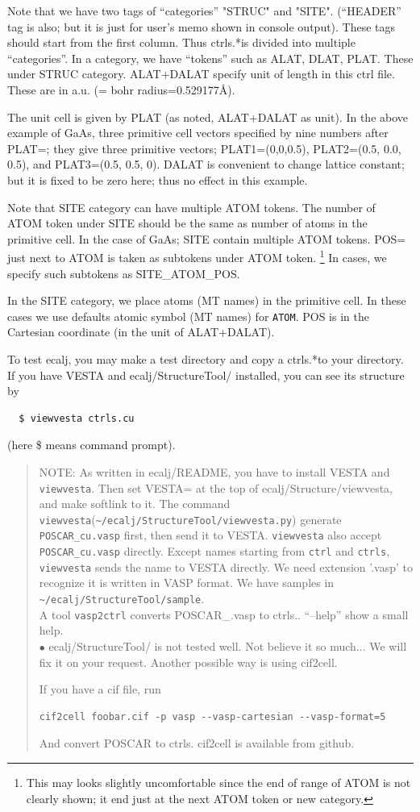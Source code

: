 \documentclass[a4paper,10pt,epsf,fleqn]{article}
\newcommand{\io}[1]{{\sf  #1}}
\newcommand{\ctrls}{{\io{ctrls.*}\space }}
\begin{document}
Note that we have two tags of ``categories'' "STRUC" and "SITE". 
(``HEADER'' tag is also; but it is just for user's memo shown in console output).
These tags should start from the first column. 
Thus \ctrls is divided into multiple ``categories''.
In a category, we have ``tokens'' such as ALAT, DLAT, PLAT. 
These under STRUC category. 
ALAT+DALAT specify unit of length in this ctrl file.
These are in a.u. (= bohr radius=0.529177\AA). 

The unit cell is given by PLAT (as noted, ALAT+DALAT as unit).
In the above example of GaAs, three primitive cell vectors specified by nine
numbers after PLAT=; they give three primitive vectors;
PLAT1=(0,0,0.5), PLAT2=(0.5, 0.0, 0.5), and PLAT3=(0.5, 0.5, 0). 
DALAT is convenient to change lattice constant; but it is fixed to be
zero here; thus no effect in this example.

Note that SITE category can have multiple ATOM tokens. The number of
ATOM token under SITE should be the same as number of atoms in the primitive cell.
In the case of GaAs; SITE contain multiple ATOM tokens.
POS= just next to ATOM is taken as subtokens under ATOM token. 
\footnote{This may looks slightly uncomfortable since the end of range of ATOM
 is not clearly shown; it end just at the next ATOM token or new category.}
In cases, we specify such subtokens as SITE\_ATOM\_POS.

In the SITE category, we place atoms (MT names) in the primitive cell.
In these cases we use defaults atomic symbol (MT names) for \verb+ATOM+.
POS is in the Cartesian coordinate (in the unit of ALAT+DALAT).

To test ecalj, you may make a test directory and copy a \ctrls to your directory.
If you have VESTA and ecalj/StructureTool/ installed, you can see its structure by 
\begin{verbatim}
  $ viewvesta ctrls.cu
\end{verbatim}
(here \$ means command prompt).
\begin{quote}
NOTE: As written in ecalj/README, you have to install VESTA and \verb+viewvesta+. 
Then set VESTA= at the top of ecalj/Structure/viewvesta, and make softlink to it.
The command \verb+viewvesta+(\verb+~/ecalj/StructureTool/viewvesta.py+)
generate \verb+POSCAR_cu.vasp+ first, then send it to VESTA.
\verb+viewvesta+ also accept \verb+POSCAR_cu.vasp+ directly.
Except names starting from \verb+ctrl+ and \verb+ctrls+,
\verb+viewvesta+ sends the name to VESTA directly. 
We need extension '.vasp' to recognize it is written in VASP format.
We have samples in \verb+~/ecalj/StructureTool/sample+.\\
A tool \verb+vasp2ctrl+ converts POSCAR\_\*.vasp to ctrls.\*.
``--help'' show a small help. \\
$\bullet$ ecalj/StructureTool/ is not tested well. Not believe it so
much... We will fix it on your request.
Another possible way is using cif2cell.

If you have a cif file, run
\begin{verbatim}
cif2cell foobar.cif -p vasp --vasp-cartesian --vasp-format=5
\end{verbatim}
And convert POSCAR to ctrls. cif2cell is available from github.
\end{quote}
\end{document}
